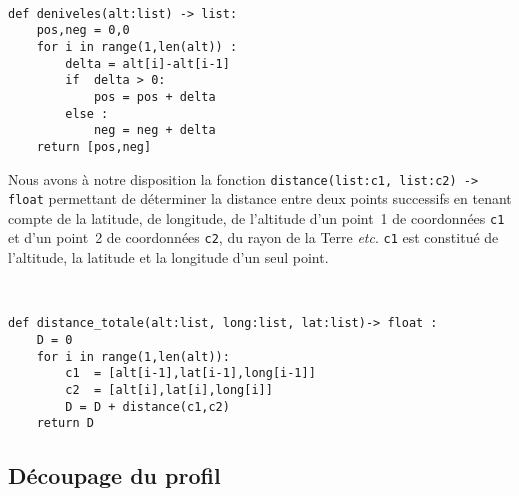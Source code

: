 \ifprof
\begin{corrige}~\\
\vspace{-.5cm}
\begin{lstlisting}
def deniveles(alt:list) -> list:
    pos,neg = 0,0
    for i in range(1,len(alt)) : 
        delta = alt[i]-alt[i-1]
        if  delta > 0: 
            pos = pos + delta
        else : 
            neg = neg + delta
    return [pos,neg]
\end{lstlisting}
\end{corrige}
\else
\fi

\ifprof
\else
\vspace{.25cm}

Nous avons à notre disposition la fonction \texttt{distance(list:c1, list:c2) -> float} permettant de déterminer la distance entre deux points successifs en tenant compte de la latitude, de longitude, de l'altitude d'un point~1 de coordonnées \texttt{c1} et d'un point~2 de coordonnées \texttt{c2}, du rayon de la Terre \textit{etc}. \texttt{c1} est constitué de l'altitude, la latitude et la longitude d'un seul point.
\fi

\ifprof
\begin{corrige}~\\
\vspace{-.5cm}
\begin{lstlisting}
def distance_totale(alt:list, long:list, lat:list)-> float :
    D = 0
    for i in range(1,len(alt)):
        c1  = [alt[i-1],lat[i-1],long[i-1]]
        c2  = [alt[i],lat[i],long[i]]
        D = D + distance(c1,c2)
    return D
\end{lstlisting}
\end{corrige}
\else
\fi


\ifprof
\else
\newpage
\fi

\subsection{Découpage du profil}

